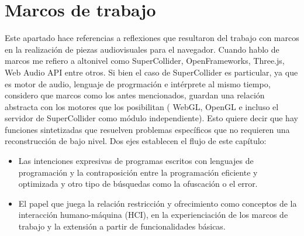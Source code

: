 
\chapter{Marcos de trabajo}





Este apartado hace referencias a reflexiones que resultaron del trabajo con marcos en la realización de piezas audiovisuales para el navegador. Cuando hablo de marcos me refiero a \gls{altonivel} como SuperCollider, OpenFrameworks, Three.js, Web Audio API entre otros. Si bien el caso de SuperCollider es particular, ya que es motor de audio, lenguaje de progrmación e intérprete al mismo tiempo, considero que marcos como los antes mencionados, guardan una relación abstracta con los motores que los posibilitan ( WebGL, OpenGL e incluso el servidor de SuperCollider como módulo independiente). Esto quiere decir que hay funciones sintetizadas que resuelven problemas específicos que no requieren una reconstrucción de bajo nivel. Dos ejes establecen el flujo de este capítulo:

\begin{itemize}

\item Las intenciones expresivas de programas escritos con lenguajes de programación y la contraposición entre la programación eficiente y optimizada y otro tipo de búsquedas como la ofuscación o el error.

\item El papel que juega la relación restricción y ofrecimiento como conceptos de la interacción humano-máquina (HCI), en la experienciación de los marcos de trabajo y la extensión a partir de funcionalidades básicas. 
  
\end{itemize}

